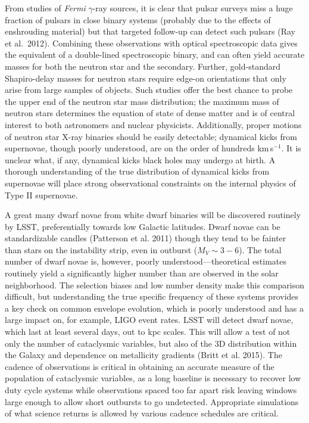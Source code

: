 From studies of \emph{Fermi} $\gamma$-ray sources, it is clear that pulsar surveys miss a huge fraction of pulsars in close binary systems (probably due to the effects of enshrouding material) but that targeted follow-up can detect such pulsars (Ray et al.~2012). Combining these observations with optical spectroscopic data gives the equivalent of a double-lined spectroscopic binary, and can often yield accurate masses for both the neutron star and the secondary. Further, gold-standard Shapiro-delay masses for neutron stars require edge-on orientations that only arise
from large samples of objects. Such studies offer the best chance to probe the upper end of the neutron star mass distribution; the maximum mass of neutron stars determines the equation of state of dense matter and is of central interest to both astronomers and nuclear physicists. Additionally, proper motions of neutron star X-ray binaries should be easily detectable; dynamical kicks from supernovae, though poorly understood, are on the order of hundreds km\,s$^{-1}$. It is unclear what, if any, dynamical kicks black holes may undergo at birth. A thorough understanding of the true distribution of dynamical kicks from supernovae will place strong observational constraints on the internal physics of Type II supernovae. 

A great many dwarf novae from white dwarf binaries will be discovered routinely by LSST, preferentially towards low Galactic latitudes. Dwarf novae can be standardizable candles (Patterson et al. 2011) though they tend to be fainter than stars on the instability strip, even in outburst ($M_{V}\sim 3-6$). The total number of dwarf novae is, however, poorly understood---theoretical estimates routinely yield a significantly higher number than are observed in the solar neighborhood. The selection biases and low number density make this comparison difficult, but understanding the true specific frequency of these systems provides a key check on common envelope evolution, which is poorly understood and has a large impact on, for example, LIGO event rates. LSST will detect dwarf novae, which last at least several days, out to kpc scales. This will allow a test of not only the number of cataclysmic variables, but also of the 3D distribution within the Galaxy and dependence on metallicity gradients (Britt et al. 2015). The cadence of observations is critical in obtaining an accurate measure of the population of cataclysmic variables, as a long baseline is necessary to recover low duty cycle systems while observations spaced too far apart risk leaving windows large enough to allow short outbursts to go undetected. Appropriate simulations of what science returns is allowed by various cadence schedules are critical.


